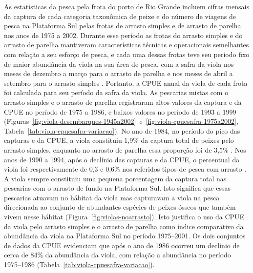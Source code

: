 \documentclass[a4paper,11pt,twoside,showtrims,onecolumn,openright,final]{memoir}
\begin{document}
As estatísticas da pesca pela frota do porto de Rio Grande incluem 
cifras mensais da captura de cada categoria taxonômica de peixe e do 
número de viagens de pesca na Plataforma Sul pelas 
frotas de arrasto simples e de arrasto de parelha nos anos de 1975 a 2002. 
Durante esse período as frotas do arrasto simples e do arrasto de parelha 
mantiveram características técnicas e operacionais semelhantes com relação 
a seu esforço de pesca, e cada uma dessas frotas teve seu período fixo de 
maior abundância da viola na sua área de pesca, com a safra da viola nos 
meses de dezembro a março para o arrasto de parelha e nos meses de abril 
a setembro para o arrasto simples \citep{miranda2003}. %
Portanto, a CPUE anual da viola de cada frota foi calculada para  
seu período da safra da viola. As pescarias mistas com o arrasto simples 
e o arrasto de parelha  registraram altos valores da captura e da CPUE no 
período de 1975 a 1986, e baixos valores no período de 1993 a 1999 
(Figuras~\ref{fig:viola-desembarques-1945a2002}~e~\ref{fig:viola-cpuesafra-1975a2002}, Tabela~\ref{tab:viola-cpuesafra-variacao}).  
No ano de 1984, no período do pico das capturas e da CPUE, a viola constituiu 1,9\% 
da captura total de peixes pelo arrasto simples, enquanto no arrasto de parelha 
essa proporção foi de 3,5\% \citep{miranda2003}. %
Nos anos de 1990 a 1994, após o declínio das capturas e da CPUE, o percentual 
da viola foi respectivamente de 0,3 e 0,6\% nos referidos 
tipos de pesca com  arrasto \citep{haimovici1997}. %
A viola sempre constituiu uma pequena porcentagem da captura total 
nas pescarias com o arrasto de fundo na Plataforma Sul. 
Isto significa que essas pescarias atuavam no hábitat da viola mas 
capturavam a viola na pesca direcionada ao conjunto de abundantes espécies 
de peixes ósseos que também vivem nesse hábitat (Figura~\ref{fig:violas-noarrasto}). 
Isto justifica o uso da CPUE da viola pelo arrasto simples e o arrasto de 
parelha como índice comparativo da abundância da viola na Plataforma Sul 
no período 1975--2001. Os dois conjuntos de dados da CPUE evidenciam 
que após o ano de 1986 ocorreu um declínio de cerca de 84\% da abundância 
da viola, com relação a abundância no período 1975--1986 (Tabela~\ref{tab:viola-cpuesafra-variacao}). 

%
%
\end{document}
